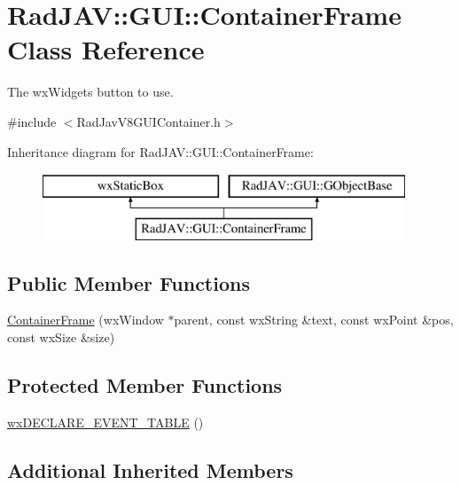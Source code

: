 \hypertarget{class_rad_j_a_v_1_1_g_u_i_1_1_container_frame}{}\section{Rad\+J\+AV\+:\+:G\+UI\+:\+:Container\+Frame Class Reference}
\label{class_rad_j_a_v_1_1_g_u_i_1_1_container_frame}


The wx\+Widgets button to use.  




{\ttfamily \#include $<$Rad\+Jav\+V8\+G\+U\+I\+Container.\+h$>$}

Inheritance diagram for Rad\+J\+AV\+:\+:G\+UI\+:\+:Container\+Frame\+:\begin{figure}[H]
\begin{center}
\leavevmode
\includegraphics[height=2.000000cm]{class_rad_j_a_v_1_1_g_u_i_1_1_container_frame}
\end{center}
\end{figure}
\subsection*{Public Member Functions}
\begin{DoxyCompactItemize}
\item 
\mbox{\hyperlink{class_rad_j_a_v_1_1_g_u_i_1_1_container_frame_aff13072cfb023bd500e91c4813ee639e}{Container\+Frame}} (wx\+Window $\ast$parent, const wx\+String \&text, const wx\+Point \&pos, const wx\+Size \&size)
\end{DoxyCompactItemize}
\subsection*{Protected Member Functions}
\begin{DoxyCompactItemize}
\item 
\mbox{\hyperlink{class_rad_j_a_v_1_1_g_u_i_1_1_container_frame_ae887193bbdc50dc7df0c0e3814c50495}{wx\+D\+E\+C\+L\+A\+R\+E\+\_\+\+E\+V\+E\+N\+T\+\_\+\+T\+A\+B\+LE}} ()
\end{DoxyCompactItemize}
\subsection*{Additional Inherited Members}


